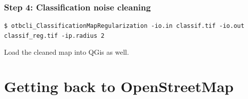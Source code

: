 \documentclass[8pt]{beamer}
\begin{document}
\begin{frame}[fragile]
\frametitle{Step 4: Classification noise cleaning}
\begin{scriptsize}
\begin{verbatim}
$ otbcli_ClassificationMapRegularization -io.in classif.tif -io.out classif_reg.tif -ip.radius 2
\end{verbatim}
\end{scriptsize}

Load the cleaned map into QGis as well.

\end{frame}


\section{Getting back to OpenStreetMap}
\end{document}
